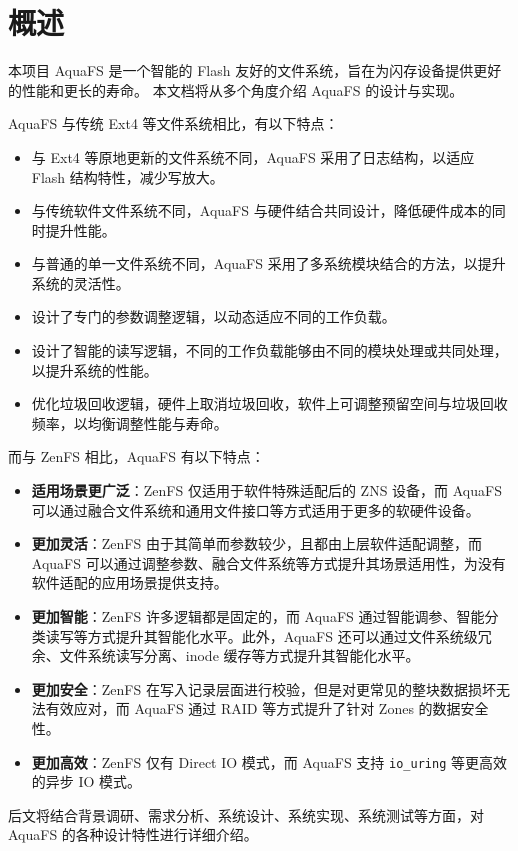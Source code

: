 \section{概述}

本项目 AquaFS 是一个智能的 Flash 友好的文件系统，旨在为闪存设备提供更好的性能和更长的寿命。
本文档将从多个角度介绍 AquaFS 的设计与实现。

AquaFS 与传统 Ext4 等文件系统相比，有以下特点：

\begin{itemize}
    \item 与 Ext4 等原地更新的文件系统不同，AquaFS 采用了日志结构，以适应 Flash 结构特性，减少写放大。
    \item 与传统软件文件系统不同，AquaFS 与硬件结合共同设计，降低硬件成本的同时提升性能。
    \item 与普通的单一文件系统不同，AquaFS 采用了多系统模块结合的方法，以提升系统的灵活性。
    \item 设计了专门的参数调整逻辑，以动态适应不同的工作负载。
    \item 设计了智能的读写逻辑，不同的工作负载能够由不同的模块处理或共同处理，以提升系统的性能。
    \item 优化垃圾回收逻辑，硬件上取消垃圾回收，软件上可调整预留空间与垃圾回收频率，以均衡调整性能与寿命。
\end{itemize}

而与 ZenFS 相比，AquaFS 有以下特点：

\begin{itemize}
    \item \textbf{适用场景更广泛}：ZenFS 仅适用于软件特殊适配后的 ZNS 设备，而 AquaFS 可以通过融合文件系统和通用文件接口等方式适用于更多的软硬件设备。
    \item \textbf{更加灵活}：ZenFS 由于其简单而参数较少，且都由上层软件适配调整，而 AquaFS 可以通过调整参数、融合文件系统等方式提升其场景适用性，为没有软件适配的应用场景提供支持。
    \item \textbf{更加智能}：ZenFS 许多逻辑都是固定的，而 AquaFS 通过智能调参、智能分类读写等方式提升其智能化水平。此外，AquaFS 还可以通过文件系统级冗余、文件系统读写分离、inode 缓存等方式提升其智能化水平。
    \item \textbf{更加安全}：ZenFS 在写入记录层面进行校验，但是对更常见的整块数据损坏无法有效应对，而 AquaFS 通过 RAID 等方式提升了针对 Zones 的数据安全性。
    \item \textbf{更加高效}：ZenFS 仅有 Direct IO 模式，而 AquaFS 支持 \verb|io_uring| 等更高效的异步 IO 模式。
\end{itemize}

后文将结合背景调研、需求分析、系统设计、系统实现、系统测试等方面，对 AquaFS 的各种设计特性进行详细介绍。
